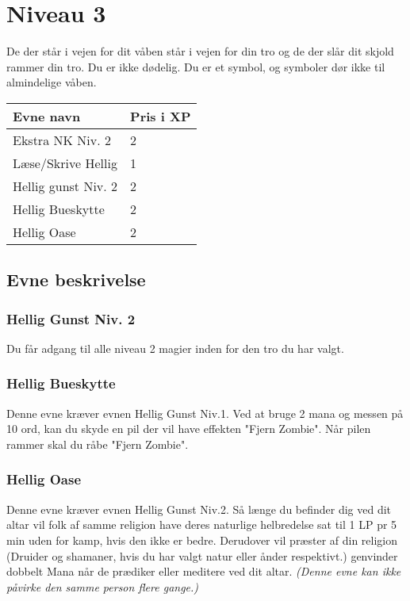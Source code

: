 \chapter{Niveau 3}
De der står i vejen for dit våben står i vejen for din tro og de der slår dit skjold rammer din tro. Du er ikke dødelig. Du er et symbol, og symboler dør ikke til almindelige våben.

\begin{table}[H]
    \centering
    \begin{tabular}{|p{}|p{}|}
    \rowcolor{cerulean!80}\hline
        Evne navn & Pris i XP \\\hline
        Ekstra NK Niv. 2 & 2 \\\hline
        Læse/Skrive Hellig & 1\\\hline
        Hellig gunst Niv. 2 &2\\\hline
        Hellig Bueskytte & 2\\\hline
        Hellig Oase & 2 \\\hline
    \end{tabular}
\end{table}
\section{Evne beskrivelse}




\subsection{Hellig Gunst Niv. 2}
Du får adgang til alle niveau 2 magier inden for den tro du har valgt.

\subsection{Hellig Bueskytte}
Denne evne kræver evnen Hellig Gunst Niv.1. Ved at bruge 2 mana og messen på 10 ord, kan du skyde en pil der vil have effekten "Fjern Zombie". Når pilen rammer skal du råbe "Fjern Zombie".

\subsection{Hellig Oase}
Denne evne kræver evnen Hellig Gunst Niv.2. Så længe du befinder dig ved dit altar vil folk af samme religion have deres naturlige helbredelse sat til 1 LP pr 5 min uden for kamp, hvis den ikke er bedre. Derudover vil præster af din religion (Druider og shamaner, hvis du har valgt natur eller ånder respektivt.) genvinder dobbelt Mana når de prædiker eller meditere ved dit altar. \textit{(Denne evne kan ikke påvirke den samme person flere gange.)}
